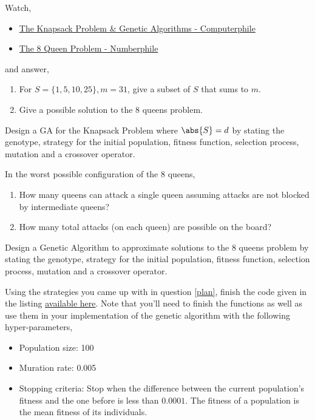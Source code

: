 \documentclass{homework}
\begin{document}
\question\label{example} Watch,
\begin{itemize}
  \item \href{https://www.youtube.com/watch?v=MacVqujSXWE}{The Knapsack Problem \& Genetic Algorithms - Computerphile}
  \item \href{https://www.youtube.com/watch?v=jPcBU0Z2Hj8}{The 8 Queen Problem - Numberphile}
\end{itemize}

and answer,

\begin{enumerate}[label=(\alph*)]
  \item For $S = \{1, 5, 10, 25\}, m = 31$, give a subset of $S$ that
        sums to $m$.
  \item Give a possible solution to the 8 queens problem.
\end{enumerate}

\question\label{knpga} Design a GA for the Knapsack Problem where $\abs{S}=d$ by
stating the genotype, strategy for the initial population, fitness
function, selection process, mutation and a crossover operator.

\question In the worst possible configuration of the 8 queens,
\begin{enumerate}
  \item How many queens can attack a single queen assuming attacks are not
        blocked by intermediate queens?
  \item How many total attacks (on each queen) are possible on the board?
\end{enumerate}

\question\label{plan} Design a Genetic Algorithm to approximate
solutions to the 8 queens problem by stating the genotype, strategy
for the initial population, fitness function, selection process,
mutation and a crossover operator.

\question\label{code} Using the strategies you came up with in
question \ref{plan}, finish the code given in the listing
\href{https://tashfeen.org/s/mll/stubs.py}{available here}. Note
that you'll need to finish the functions as well as use them in your
implementation of the genetic algorithm with the following
hyper-parameters,

\begin{itemize}
  \item Population size: 100
  \item Muration rate: 0.005
  \item Stopping criteria: Stop when the difference between the current
        population's fitness and the one before is less than $0.0001$. The
        fitness of a population is the mean fitness of its individuals.
\end{itemize}
\end{document}
